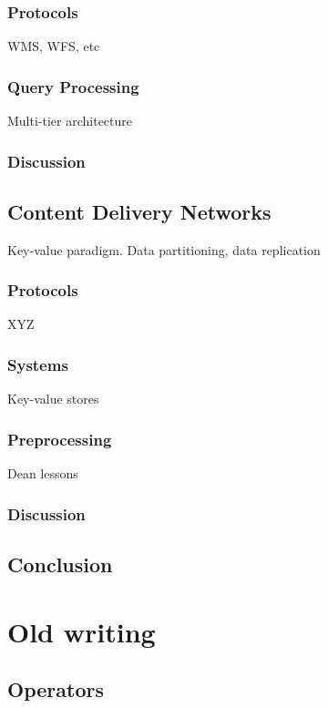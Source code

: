\documentclass[11pt, oneside]{report}
\begin{document}
\subsection{Protocols}
WMS, WFS, etc

\subsection{Query Processing}
Multi-tier architecture

\subsection{Discussion}

\section{Content Delivery Networks}
Key-value paradigm. Data partitioning, data replication

\subsection{Protocols}
XYZ

\subsection{Systems}
Key-value stores

\subsection{Preprocessing}
Dean lessons

\subsection{Discussion}

\section{Conclusion}





\chapter{Old writing}

\section{Operators}
\label{state:of:the:art:map:generalization:operators}
\end{document}
